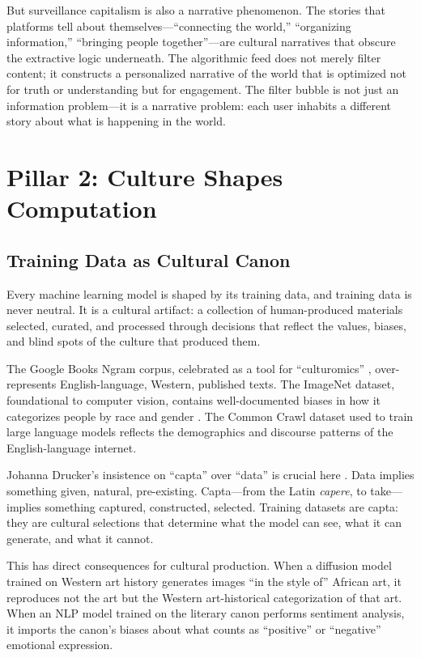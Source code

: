 \documentclass[11pt,a4paper]{article}
\begin{document}
But surveillance capitalism is also a narrative phenomenon. The stories that platforms tell about themselves---``connecting the world,'' ``organizing information,'' ``bringing people together''---are cultural narratives that obscure the extractive logic underneath. The algorithmic feed does not merely filter content; it constructs a personalized narrative of the world that is optimized not for truth or understanding but for engagement. The filter bubble \citep{pariser2011} is not just an information problem---it is a narrative problem: each user inhabits a different story about what is happening in the world.

\section{Pillar 2: Culture Shapes Computation}

\subsection{Training Data as Cultural Canon}

Every machine learning model is shaped by its training data, and training data is never neutral. It is a cultural artifact: a collection of human-produced materials selected, curated, and processed through decisions that reflect the values, biases, and blind spots of the culture that produced them.

The Google Books Ngram corpus, celebrated as a tool for ``culturomics'' \citep{michel2011}, over-represents English-language, Western, published texts. The ImageNet dataset, foundational to computer vision, contains well-documented biases in how it categorizes people by race and gender \citep{crawford2019}. The Common Crawl dataset used to train large language models reflects the demographics and discourse patterns of the English-language internet.

Johanna Drucker's insistence on ``capta'' over ``data'' is crucial here \citep{drucker2011}. Data implies something given, natural, pre-existing. Capta---from the Latin \emph{capere}, to take---implies something captured, constructed, selected. Training datasets are capta: they are cultural selections that determine what the model can see, what it can generate, and what it cannot.

This has direct consequences for cultural production. When a diffusion model trained on Western art history generates images ``in the style of'' African art, it reproduces not the art but the Western art-historical categorization of that art. When an NLP model trained on the literary canon performs sentiment analysis, it imports the canon's biases about what counts as ``positive'' or ``negative'' emotional expression.
\end{document}
